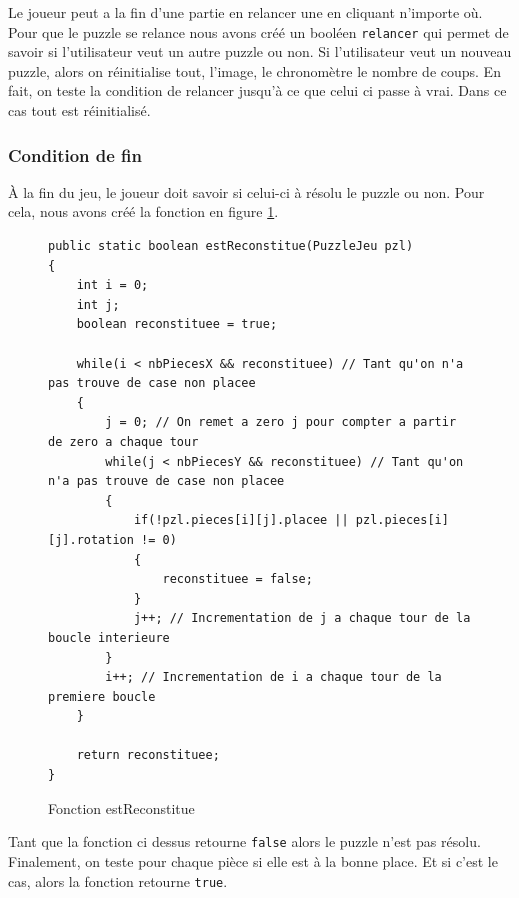 \documentclass[]{article}
\newcommand{\variable}[1]{\noindent \texttt{#1}}
\begin{document}
Le joueur peut a la fin d'une partie en  relancer une en cliquant n'importe où. Pour que le puzzle se relance nous avons créé un booléen \variable{relancer} qui permet de savoir si l'utilisateur veut un autre puzzle ou non. Si l'utilisateur veut un nouveau puzzle, alors on réinitialise tout, l'image, le chronomètre le nombre de coups. En fait, on teste la condition de relancer jusqu'à ce que celui ci passe à vrai. Dans ce cas tout est réinitialisé. 

\subsubsection{Condition de fin}

À la fin du jeu, le joueur doit savoir si celui-ci à résolu le puzzle ou non. Pour cela, nous avons créé la fonction en figure \no\ref{Fonction  estReconstitue}.

\begin{figure}[hpt]
	\center
	\caption{\label{Fonction  estReconstitue} Fonction  estReconstitue}
\begin{lstlisting}
public static boolean estReconstitue(PuzzleJeu pzl)
{
    int i = 0;
    int j;
    boolean reconstituee = true;

    while(i < nbPiecesX && reconstituee) // Tant qu'on n'a pas trouve de case non placee
    {
        j = 0; // On remet a zero j pour compter a partir de zero a chaque tour
        while(j < nbPiecesY && reconstituee) // Tant qu'on n'a pas trouve de case non placee
        {
            if(!pzl.pieces[i][j].placee || pzl.pieces[i][j].rotation != 0)
            {
                reconstituee = false;
            }
            j++; // Incrementation de j a chaque tour de la boucle interieure
        }
        i++; // Incrementation de i a chaque tour de la premiere boucle
    }

    return reconstituee;
}
\end{lstlisting}
\end{figure}

Tant que la fonction ci dessus retourne \variable{false} alors le puzzle n'est pas résolu. Finalement, on teste pour chaque pièce si elle est à la bonne place. Et si c'est le cas, alors la fonction retourne \variable{true}. 





\end{document}
